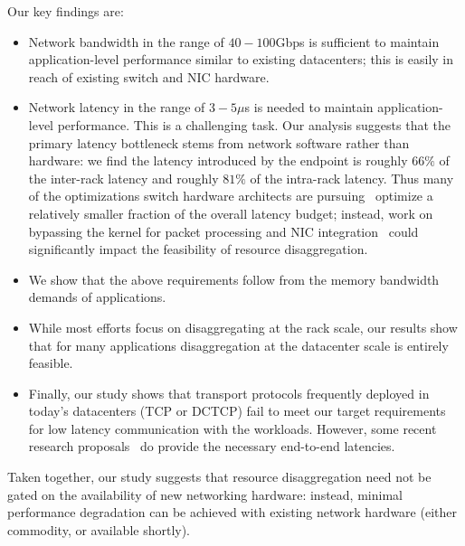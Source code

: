 \noindent Our key findings are:
\vspace{-0.5em}
\begin{itemize}[leftmargin=*]
\itemsep0em
	\item Network bandwidth in the range of $40-100$Gbps  is sufficient to maintain application-level performance similar to existing datacenters; this is easily in reach of existing switch and NIC hardware. 
	\item Network latency in the range of $3-5\mu$s is needed to maintain application-level performance. This is a challenging task. Our analysis suggests that the primary latency bottleneck stems from  network software rather than hardware: we find the latency introduced by the endpoint is roughly $66\%$ of the inter-rack latency and roughly $81\%$ of the intra-rack latency. Thus many of the optimizations switch hardware architects are pursuing~\cite{mellanox} optimize a relatively smaller fraction of the overall latency budget; instead, work on bypassing the kernel for packet processing and NIC integration~\cite{cpu-nic} could significantly impact the feasibility of resource disaggregation.
	\item We show that the above requirements follow from the memory bandwidth demands of applications.
	\item While most efforts focus on disaggregating at the rack scale, our results show that for many applications disaggregation at the datacenter scale is entirely feasible.	%
 	\item Finally, our study shows that transport protocols frequently deployed in today's datacenters (TCP or DCTCP) fail to meet our target requirements for low latency communication with the \dis workloads. However, some recent research proposals~\cite{pfabric, phost} do provide the necessary end-to-end latencies. 
\end{itemize} 

\noindent
Taken together, our study suggests that resource disaggregation need not be gated on the availability of new networking hardware: instead, minimal performance degradation can be achieved with existing network hardware (either commodity, or available shortly).

